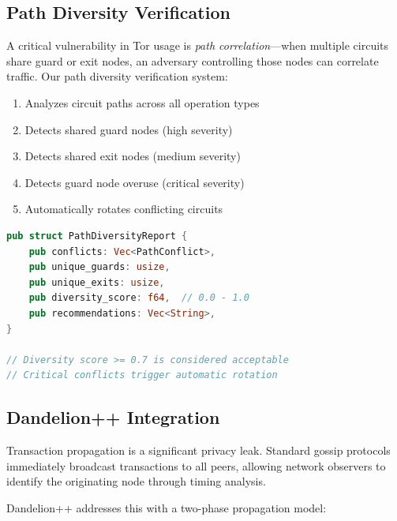 \documentclass[11pt,a4paper]{article}
\begin{document}
\subsection{Path Diversity Verification}

A critical vulnerability in Tor usage is \textit{path correlation}---when multiple circuits share guard or exit nodes, an adversary controlling those nodes can correlate traffic. Our path diversity verification system:

\begin{enumerate}[leftmargin=*]
    \item Analyzes circuit paths across all operation types
    \item Detects shared guard nodes (high severity)
    \item Detects shared exit nodes (medium severity)
    \item Detects guard node overuse (critical severity)
    \item Automatically rotates conflicting circuits
\end{enumerate}

\begin{lstlisting}[language=Rust, caption=Path Diversity Check]
pub struct PathDiversityReport {
    pub conflicts: Vec<PathConflict>,
    pub unique_guards: usize,
    pub unique_exits: usize,
    pub diversity_score: f64,  // 0.0 - 1.0
    pub recommendations: Vec<String>,
}

// Diversity score >= 0.7 is considered acceptable
// Critical conflicts trigger automatic rotation
\end{lstlisting}

\subsection{Dandelion++ Integration}

Transaction propagation is a significant privacy leak. Standard gossip protocols immediately broadcast transactions to all peers, allowing network observers to identify the originating node through timing analysis.

Dandelion++ addresses this with a two-phase propagation model:
\end{document}
